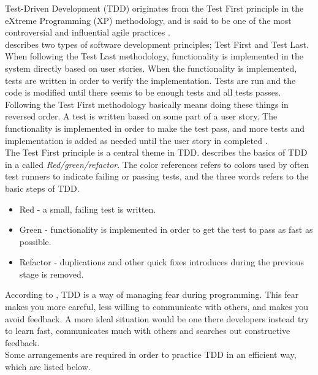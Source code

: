 Test-Driven Development (TDD) originates from the Test First principle
in the eXtreme Programming (XP) methodology, and is said to be one of
the most controversial and influential agile practices
\cite{book:tdd_madeyski}.\\

\citet{book:tdd_madeyski} describes two types of software development
principles; Test First and Test Last. When following the Test Last
methodology, functionality is implemented in the system directly based
on user stories. When the functionality is implemented, tests are
written in order to verify the implementation. Tests are run and the
code is modified until there seems to be enough tests and all tests
passes.\\

Following the Test First methodology basically means doing these things
in reversed order. A test is written based on some part of a user story.
The functionality is implemented in order to make the test pass, and
more tests and implementation is added as needed until the user story in
completed \cite{book:tdd_madeyski}.\\

The Test First principle is a central theme in TDD.
\citet{book:tdd_beck} describes the basics of TDD in a 
called \emph{Red/green/refactor}. The color references refers to colors
used by often test runners to indicate failing or passing tests, and the
three words refers to the basic steps of TDD.

\begin{itemize}
    \item Red - a small, failing test is written.
    \item Green - functionality is implemented in order to get the test
          to pass as fast as possible.
    \item Refactor - duplications and other quick fixes introduces
          during the previous stage is removed.
\end{itemize}

According to \citeauthor{book:tdd_beck}, TDD is a way of managing fear
during programming. This fear makes you more careful, less willing to
communicate with others, and makes you avoid feedback. A more ideal
situation would be one there developers instead try to learn fast,
communicates much with others and searches out constructive feedback.\\

Some arrangements are required in order to practice TDD in an efficient
way, which are listed below.

